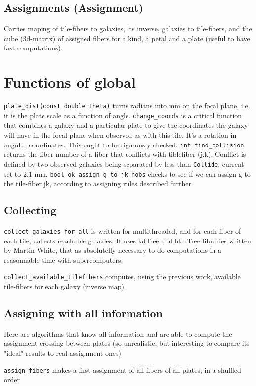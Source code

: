 \documentclass{article}
\begin{document}
\subsection{Assignments (Assignment)}
Carries maping of tile-fibers to galaxies, its inverse, galaxies to tile-fibers, and the cube (3d-matrix) of assigned fibers for a kind, a petal and a plate (useful to have fast computations).

\section{Functions of global}
  {\tt plate\_dist(const double theta)} turns radians into mm on the focal plane, i.e. it is the plate scale as a function of angle.
  {\tt change\_coords} is a critical function that combines a galaxy and a particular plate to give the coordinates the galaxy will have in the focal plane when observed as with this tile. It's a rotation in angular coordinates. This ought to be rigorously checked.
 {\tt int find\_collision} returns the fiber number of a fiber that conflicts with tiblefiber (j,k).  Conflict is defined by two observed galaxies being separated by less than {\tt Collide}, current set to 2.1 mm.
{\tt bool  ok\_assign\_g\_to\_jk\_nobs} checks to see if we can assign g to the tile-fiber jk, according to assigning rules described further

\subsection{Collecting}
  {\tt collect\_galaxies\_for\_all} is written for multithreaded, and for each fiber of each tile, collects reachable galaxies. It uses kdTree and htmTree libraries written by Martin White, that as absolutelly necessary to do computations in a reasonnable time with supercomputers.
  
  {\tt collect\_available\_tilefibers} computes, using the previous work, available tile-fibers for each galaxy (inverse map)
  
\subsection{Assigning with all information}
Here are algorithms that know all information and are able to compute the assignment crossing between plates (so unrealistic, but interesting to compare its "ideal" results to real assignment ones)

{\tt assign\_fibers} makes a first assignment of all fibers of all plates, in a shuffled order
\end{document}
